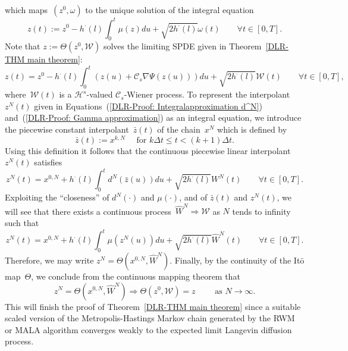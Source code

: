 which maps~$(z^0, \omega)$ to the unique solution of the integral equation
\begin{equation}
  z(t) := z^0 - h^{\cdot}(l) \int_0^t \mu(z) du + \sqrt{2 h^{\cdot}(l)} \omega(t) \qquad \forall t \in [0,T].
\end{equation}
Note that $z := \Theta (z^0, \mathcal{W})$ solves the limiting SPDE given in Theorem~\ref{DLR-THM main theorem}:
\begin{equation}
 z(t) = z^0 -  h^{\cdot}(l) \int_0^t (z(u) + \mathcal{C}_s \nabla \Psi(z(u))) du + \sqrt{2 h^{\cdot}(l)} \mathcal{W}(t) \qquad \forall t \in [0,T],
\end{equation}
where~$\mathcal{W}(t)$ is a $ \mathcal{H}^s $-valued  $ \mathcal{C}_s $-Wiener process. To represent the interpolant~$z^N(t)$ given in Equations~(\ref{DLR-Proof: Integralapproximation d^N}) and~(\ref{DLR-Proof: Gamma approximation}) as an integral equation, we introduce the piecewise constant interpolant~$\bar{z}(t)$ of the chain~$x^N$ which is defined by
\begin{equation}
  \label{DLR: Proof Strategy Definition piecewise constant interpolant}
  \bar{z}(t) := x^{k,N} \quad \text{ for } k \Delta t \leq t < (k+1) \Delta t.
\end{equation}
Using this definition it follows that the continuous piecewise linear interpolant~$z^N(t)$ satisfies
\begin{equation}
  z^N(t) = x^{0,N} +  h^{\cdot}(l) \int_0^t d^N(\bar{z}(u)) du + \sqrt{2 h^{\cdot}(l)} W^N(t) \qquad \forall t \in [0,T].
\end{equation}
Exploiting the ``closeness'' of $d^N(\cdot)$ and $\mu(\cdot)$, and of $\bar{z}(t)$ and $z^N(t)$, we will see that there exists a continuous process~$\widehat{W}^N \Longrightarrow \mathcal{W}$ as $N$ tends to infinity such that
\begin{equation*}
 z^N(t) = x^{0,N} +  h^{\cdot}(l) \int_0^t \mu(z^N(u)) du + \sqrt{2 h^{\cdot}(l)} \widehat{W}^N(t) \qquad \forall t \in [0,T].
\end{equation*}
Therefore, we may write $z^N = \Theta (x^{0,N}, \widehat{W}^N)$. Finally, by the continuity of the It\={o} map~$\Theta$, we conclude from the continuous mapping theorem that
\begin{equation*}
  z^N = \Theta (x^{0,N}, \widehat{W}^N) \Longrightarrow \Theta (z^0, \mathcal{W}) = z \qquad \text{  as } N \to \infty.
\end{equation*}
This will finish the proof of Theorem~\ref{DLR-THM main theorem} since a suitable scaled version of the Metropolis-Hastings Markov chain generated by the RWM or MALA algorithm converges weakly to the expected limit Langevin diffusion process.



